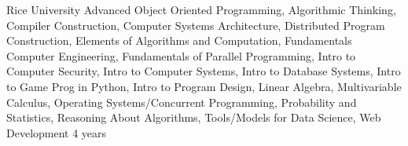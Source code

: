 

\begin{cvhonors}

    
      \cvhonor
    {Rice University} %
    {Advanced Object Oriented Programming, Algorithmic Thinking, Compiler Construction, Computer Systems Architecture, Distributed Program Construction, Elements of Algorithms and Computation, Fundamentals Computer Engineering, Fundamentals of Parallel Programming, Intro to Computer Security, Intro to Computer Systems, Intro to Database Systems, Intro to Game Prog in Python, Intro to Program Design, Linear Algebra, Multivariable Calculus, Operating Systems/Concurrent Programming, Probability and Statistics, Reasoning About Algorithms, Tools/Models for Data Science, Web Development}
    {4 years}
    {}


\end{cvhonors}